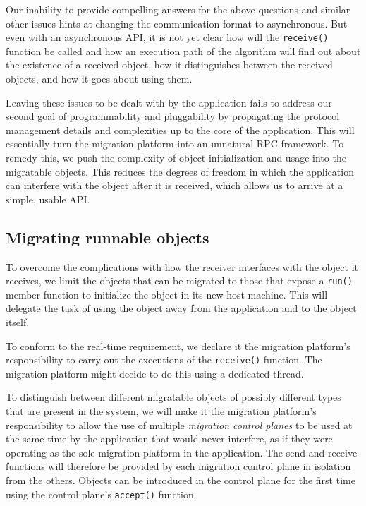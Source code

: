 Our inability to provide compelling answers for the above questions
and similar other issues hints
at changing the communication format to asynchronous. But even with an
asynchronous API, it is not yet clear how will the \texttt{receive()}
function be called and how an execution path of the algorithm will find
out about the existence of a received object, how it distinguishes between
the received objects, and how it goes about using them.

Leaving these issues to be dealt with by the application
fails to address our second goal of programmability and pluggability
by propagating the protocol management details and complexities up to the
core of the application. This will essentially turn the migration
platform into an unnatural RPC framework. To remedy this, we push the
complexity of object initialization and usage into the migratable
objects. This reduces the degrees of freedom in which the application
can interfere with the object after it is received, which allows us to
arrive at a simple, usable API.

\subsection{Migrating runnable objects}
\label{subsec:runnable}
To overcome the complications with how the receiver interfaces with the
object it receives, we limit the objects that can be migrated to those
that expose a \texttt{run()} member function to
initialize the object in its new host machine. This will delegate the task
of using the object away from the application and to the object itself.

To conform to the real-time requirement, we declare it the migration
platform's responsibility to carry out the executions of the
\texttt{receive()} function. The migration platform might decide to do
this using a dedicated thread.

To distinguish between different migratable objects of possibly different
types that are present in the system, we will make it the migration
platform's responsibility to allow the use of multiple
\emph{migration control planes} to be used at the same time by the
application that would never interfere, as if they were operating
as the sole migration platform in the application.
The send and receive functions
will therefore be provided by each migration control plane in isolation
from the others. Objects can be introduced in the control plane for the
first time using the control plane's \texttt{accept()} function.

